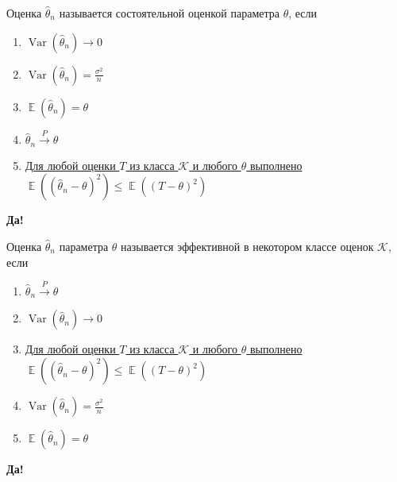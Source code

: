 \documentclass[t]{beamer}
\DeclareMathOperator{\Var}{Var}
\DeclareMathOperator{\E}{\mathbb{E}}
\begin{document}
 \begin{frame} \label{31-Yes} 
\begin{block}{31} 

  Оценка  $\hat\theta_n$ называется состоятельной оценкой параметра $\theta$, если


 \end{block} 
\begin{enumerate} 
\item[] \hyperlink{31-No}{\beamergotobutton{} $\Var(\hat\theta_n) \to 0$}
\item[] \hyperlink{31-No}{\beamergotobutton{} $\Var(\hat\theta_n)=\frac{\sigma^2}{n}$}
\item[] \hyperlink{31-No}{\beamergotobutton{} $\E(\hat\theta_n)=\theta$}
\item[] \hyperlink{31-Yes}{\beamergotobutton{} $\hat\theta_n \xrightarrow{P}\theta$}
\item[] \hyperlink{31-No}{\beamergotobutton{} Для любой оценки $T$ из класса $\mathcal{K}$ и любого $\theta$ выполнено $\E((\hat\theta_n-\theta)^2)\leq \E((T-\theta)^2)$}
\end{enumerate} 

 \textbf{Да!} 
 \hyperlink{32}{}\end{frame} 


 \begin{frame} \label{32-Yes} 
\begin{block}{32} 

    Оценка  $\hat\theta_n$ параметра $\theta$ называется эффективной в некотором классе оценок $\mathcal{K}$, если


 \end{block} 
\begin{enumerate} 
\item[] \hyperlink{32-No}{\beamergotobutton{} $\hat\theta_n \xrightarrow{P}\theta$}
\item[] \hyperlink{32-No}{\beamergotobutton{} $\Var(\hat\theta_n) \to 0$}
\item[] \hyperlink{32-Yes}{\beamergotobutton{} Для любой оценки $T$ из класса $\mathcal{K}$ и любого $\theta$ выполнено $\E((\hat\theta_n-\theta)^2)\leq \E((T-\theta)^2)$}
\item[] \hyperlink{32-No}{\beamergotobutton{} $\Var(\hat\theta_n)=\frac{\sigma^2}{n}$}
\item[] \hyperlink{32-No}{\beamergotobutton{} $\E(\hat\theta_n)=\theta$}
\end{enumerate} 

 \textbf{Да!} 
 \hyperlink{33}{}\end{frame} 
\end{document}
